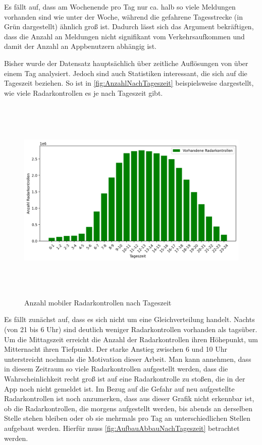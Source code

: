 Es fällt auf, dass am Wochenende pro Tag nur ca. halb so viele Meldungen vorhanden sind wie unter der Woche, während die gefahrene Tagesstrecke (in Grün dargestellt) ähnlich groß ist.
Dadurch lässt sich das Argument bekräftigen, dass die Anzahl an Meldungen nicht signifikant vom Verkehrsaufkommen und damit der Anzahl an Appbenutzern abhängig ist.

Bisher wurde der Datensatz hauptsächlich über zeitliche Auflösungen von über einem Tag analysiert.
Jedoch sind auch Statistiken interessant, die sich auf die Tageszeit beziehen.
So ist in \autoref{fig:AnzahlNachTageszeit} beispielsweise dargestellt, wie viele Radarkontrollen es je nach Tageszeit gibt.

\begin{figure}[h]
    \centering
    \includegraphics[width=1.0\textwidth,height=10cm,keepaspectratio=true]{content/images/AnzahlNachTageszeit.png}
    \caption{Anzahl mobiler Radarkontrollen nach Tageszeit}
    \label{fig:AnzahlNachTageszeit}
\end{figure}

Es fällt zunächst auf, dass es sich nicht um eine Gleichverteilung handelt.
Nachts (von 21 bis 6 Uhr) sind deutlich weniger Radarkontrollen vorhanden als tagsüber.
Um die Mittagszeit erreicht die Anzahl der Radarkontrollen ihren Höhepunkt, um Mitternacht ihren Tiefpunkt.
Der starke Anstieg zwischen 6 und 10 Uhr unterstreicht nochmals die Motivation dieser Arbeit.
Man kann annehmen, dass in diesem Zeitraum so viele Radarkontrollen aufgestellt werden,
dass die Wahrscheinlichkeit recht groß ist auf eine Radarkontrolle zu stoßen, die in der App noch nicht gemeldet ist.
Im Bezug auf die Gefahr auf neu aufgestellte Radarkontrollen ist noch anzumerken, dass aus dieser Grafik nicht erkennbar ist, ob die Radarkontrollen, die morgens aufgestellt werden, bis abends an derselben Stelle stehen bleiben oder ob sie mehrmals pro Tag an unterschiedlichen Stellen aufgebaut werden.
Hierfür muss \autoref{fig:AufbauAbbauNachTageszeit} betrachtet werden.

